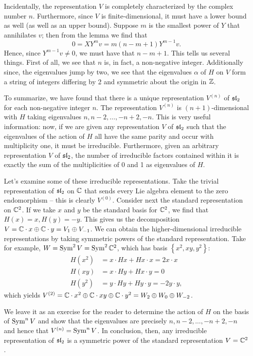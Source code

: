 \documentclass{../mathnotes}
\begin{document}
Incidentally, the representation $V$ is completely characterized by the complex number $n$.
Furthermore, since $V$ is finite-dimensional, it must have a lower bound as well (as well as an upper bound).
Suppose $m$ is the smallest power of $Y$ that annihilates $v$; then from the lemma we find that
\[0=XY^mv=m(n-m+1)Y^{m-1}v.\]
Hence, since $Y^{m-1}v\neq 0$, we must have that $n-m+1$. This tells us several things. First of all, we see that $n$ is, in fact,
a non-negative integer. Additionally since, the eigenvalues jump by two, we see that the eigenvalues $\alpha$ of $H$ on $V$
form a string of integers differing by 2 and symmetric about the origin in $\mathbb{Z}$.

To summarize, we have found that there is a unique representation $V^{(n)}$ of $\mathfrak{sl}_2$ for each non-negative integer $n$. The representation
$V^{(n)}$ is $(n+1)$-dimensional with $H$ taking eigenvalues $n,n-2,\ldots,-n+2,-n$. This is very useful information: now, if we are given any
representation $V$ of $\mathfrak{sl}_2$ such that the eigenvalues of the action of $H$ all have the same parity and occur with multiplicity one, it must be irreducible.
Furthermore, given an arbitrary representation $V$ of $\mathfrak{sl}_2$, the number of irreducible factors contained within it is exactly the sum of the multiplicities
of 0 and 1 as eigenvalues of $H$.

Let's examine some of these irreducible representations. Take the trivial representation of $\mathfrak{sl}_2$ on $\mathbb{C}$ that sends every Lie algebra
element to the zero endomorphism -- this is clearly $V^{(0)}$. Consider next the standard representation on $\mathbb{C}^2$. If we
take $x$ and $y$ be the standard basis for $\mathbb{C}^2$, we find that $H(x)=x,H(y)=-y$. This gives us the decomposition $V=\mathbb{C}\cdot x\oplus\mathbb{C}\cdot y=V_1\oplus V_{-1}$.
We can obtain the higher-dimensional irreducible representations by taking symmetric powers of the standard representation. Take for example,
$W=\operatorname{Sym}^2V=\operatorname{Sym}^2\mathbb{C}^2$, which has basis $\left\{ x^2,xy,y^2 \right\}$:
\begin{align*}
    H(x^2)&=x\cdot Hx+Hx\cdot x=2x\cdot x\\
    H(xy)&=x\cdot Hy+Hx\cdot y=0\\
    H(y^2)&=y\cdot Hy+Hy\cdot y=-2y\cdot y,
\end{align*}
which yields $V^{(2)}=\mathbb{C}\cdot x^2\oplus\mathbb{C}\cdot xy\oplus\mathbb{C}\cdot y^2=W_2\oplus W_0\oplus W_{-2}$.

We leave it as an exercise for the reader to determine the action of $H$ on the basis of $\operatorname{Sym}^n V$ and show that the
eigenvalues are precisely $n,n-2,\ldots,-n+2,-n$ and hence that $V^{(n)}=\operatorname{Sym}^n V$. In conclusion, then, any irreducible representation of $\mathfrak{sl}_2$
is a symmetric power of the standard representation $V=\mathbb{C}^2$.
\end{document}
